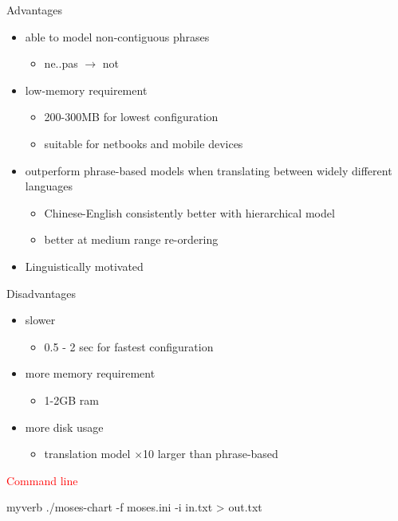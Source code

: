 \documentclass[landscape]{uedslides2C}
\begin{document}
{\small \begin{multicols}{2}

Advantages
\begin{itemize}
\item able to model non-contiguous phrases
	\begin{itemize}
	\item ne..pas $\rightarrow$ not
	\end{itemize}
\item low-memory requirement
	\begin{itemize}
	\item 200-300MB for lowest configuration
	\item suitable for netbooks and mobile devices
	\end{itemize}
\item outperform phrase-based models when translating between widely different languages
	\begin{itemize}
	\item Chinese-English consistently better with hierarchical model 
	\item better at medium range re-ordering
	\end{itemize}
\item Linguistically motivated 
\end{itemize}

\columnbreak

Disadvantages
\begin{itemize}
\item slower
	\begin{itemize}
	\item 0.5 - 2 sec for fastest configuration
	\end{itemize}
\item more memory requirement
	\begin{itemize}
	\item 1-2GB ram
	\end{itemize}
\item more disk usage
	\begin{itemize}
	\item translation model $\times$10 larger than phrase-based
	\end{itemize}
\end{itemize}

\end{multicols}
}
\begin{center}
\textcolor{red}{Command line} 
\begin{SaveVerbatim}{myverb}
./moses-chart -f moses.ini -i in.txt > out.txt
\end{SaveVerbatim}
\colorbox{gray}{}
\end{center}
\end{document}
